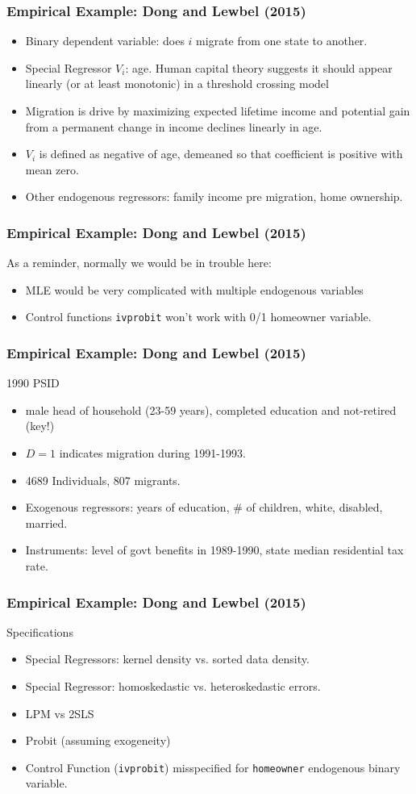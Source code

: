 \documentclass[11pt,dvipsnames,table,aspectratio=169]{beamer}
\begin{document}
\begin{frame}
\frametitle{Empirical Example: Dong and Lewbel (2015)}
\begin{itemize}
\item Binary dependent variable: does $i$ migrate from one state to another. 
\item Special Regressor $V_i$: age. Human capital theory suggests it should appear linearly (or at least monotonic) in a threshold crossing model 
\item Migration is drive by maximizing expected lifetime income and potential gain from a permanent change in income declines linearly in age.
\item $V_i$ is defined as negative of age, demeaned so that coefficient is positive with mean zero.
\item Other endogenous regressors: family income pre migration, home ownership.
\end{itemize}
\end{frame}

\begin{frame}
\frametitle{Empirical Example: Dong and Lewbel (2015)}
As a reminder, normally we would be in trouble here:
\begin{itemize}
\item MLE would be very complicated with multiple endogenous variables
\item Control functions \texttt{ivprobit} won't work with 0/1 homeowner variable.
\end{itemize}
\end{frame}

\begin{frame}
\frametitle{Empirical Example: Dong and Lewbel (2015)}
1990 PSID
\begin{itemize}
\item male head of household (23-59 years), completed education and not-retired (key!)
\item $D=1$ indicates migration during 1991-1993.
\item 4689 Individuals, 807 migrants.
\item Exogenous regressors: years of education, \# of children, white, disabled, married.
\item Instruments: level of govt benefits in 1989-1990, state median residential tax rate.
\end{itemize}
\end{frame}

\begin{frame}
\frametitle{Empirical Example: Dong and Lewbel (2015)}
Specifications
\begin{itemize}
\item Special Regressors: kernel density vs. sorted data density.
\item Special Regressor: homoskedastic vs. heteroskedastic errors.
\item LPM vs 2SLS
\item Probit (assuming exogeneity)
\item Control Function (\texttt{ivprobit}) misspecified for \texttt{homeowner} endogenous binary variable.
\end{itemize}
\end{frame}
\end{document}
